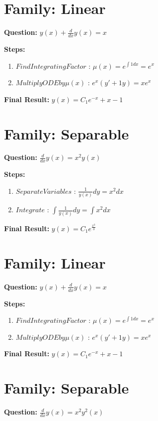 \documentclass{article}
\begin{document}
\section*{Family: Linear}
\textbf{Question:} $y{\left(x \right)} + \frac{d}{d x} y{\left(x \right)} = x$

\textbf{Steps:}
\begin{enumerate}
\item $Find Integrating Factor$ :  $\mu(x) = e^{\int 1 dx} = e^{x}$
\item $Multiply ODE by \mu(x)$ :  $e^{x}(y' + 1y) = x e^{x}$
\end{enumerate}
\textbf{Final Result:} $y{\left(x \right)} = C_{1} e^{- x} + x - 1$

\section*{Family: Separable}
\textbf{Question:} $\frac{d}{d x} y{\left(x \right)} = x^{2} y{\left(x \right)}$

\textbf{Steps:}
\begin{enumerate}
\item $Separate Variables$ :  $\frac{1}{y{\left(x \right)}} dy = x^{2} dx$
\item $Integrate$ :  $\int \frac{1}{y{\left(x \right)}} dy = \int x^{2} dx$
\end{enumerate}
\textbf{Final Result:} $y{\left(x \right)} = C_{1} e^{\frac{x^{3}}{3}}$

\section*{Family: Linear}
\textbf{Question:} $y{\left(x \right)} + \frac{d}{d x} y{\left(x \right)} = x$

\textbf{Steps:}
\begin{enumerate}
\item $Find Integrating Factor$ :  $\mu(x) = e^{\int 1 dx} = e^{x}$
\item $Multiply ODE by \mu(x)$ :  $e^{x}(y' + 1y) = x e^{x}$
\end{enumerate}
\textbf{Final Result:} $y{\left(x \right)} = C_{1} e^{- x} + x - 1$

\section*{Family: Separable}
\textbf{Question:} $\frac{d}{d x} y{\left(x \right)} = x^{2} y^{2}{\left(x \right)}$
\end{document}

